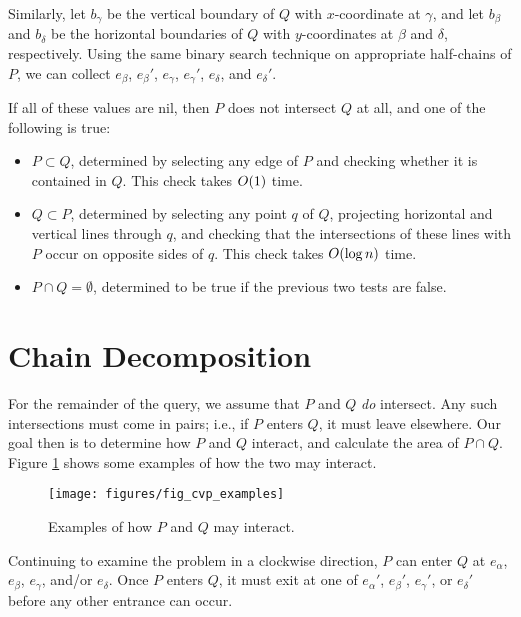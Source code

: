 Similarly, let $b_\gamma$ be the vertical boundary of $Q$ with $x$-coordinate at $\gamma$, and let $b_\beta$ and $b_\delta$ be the horizontal boundaries of $Q$ with $y$-coordinates at $\beta$ and $\delta$, respectively.  Using the same binary search technique on appropriate half-chains of $P$, we can collect $e_\beta$, $e_\beta'$, $e_\gamma$, $e_\gamma'$, $e_\delta$, and $e_\delta'$.  

If all of these values are nil, then $P$ does not intersect $Q$ at all, and one of the following is true:

\begin{itemize}
 \item $P \subset Q$, determined by selecting any edge of $P$ and checking whether it is contained in $Q$. This check takes $O\!\left(1\right)$ time.

 \item $Q \subset P$, determined by selecting any point $q$ of $Q$, projecting horizontal and vertical lines through $q$, and checking that the intersections of these lines with $P$ occur on opposite sides of $q$. This check takes $O\!\left(\log{n}\right)$ time.

 \item $P \cap Q = \emptyset$, determined to be true if the previous two tests are false.
\end{itemize}


\section{Chain Decomposition}

For the remainder of the query, we assume that $P$ and $Q$ \emph{do} intersect. Any such intersections must come in pairs; i.e., if $P$ enters $Q$, it must leave elsewhere.  Our goal then is to determine how $P$ and $Q$ interact, and calculate the area of $P \cap Q$.  Figure \ref{fig:convexp:examples} shows some examples of how the two may interact.

\begin{figure}[t]
\begin{center}
  \texttt{[image: figures/fig\_cvp\_examples]}
  \caption{Examples of how $P$ and $Q$ may interact.}
  \label{fig:convexp:examples}
\end{center}
\end{figure}

Continuing to examine the problem in a clockwise direction, $P$ can enter $Q$ at $e_\alpha$, $e_\beta$, $e_\gamma$, and/or $e_\delta$.  Once $P$ enters $Q$, it must exit at one of $e_\alpha'$, $e_\beta'$, $e_\gamma'$, or $e_\delta'$ before any other entrance can occur.

